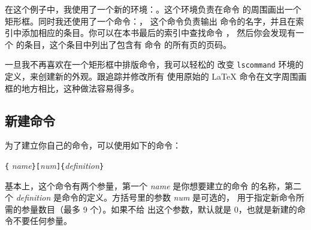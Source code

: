 \begin{example}
\begin{lscommand}
\end{lscommand}
\end{example}

在这个例子中，我使用了一个新的环境：。这个环境负责在命令
的周围画出一个矩形框。同时我还使用了一个命令：， 这个命令负责输出
命令的名字，并且在索引中添加相应的条目。你可以在本书最后的索引中查找命令 ，
然后你会发现有一个  的条目，这个条目中列出了包含有  命令
的所有页的页码。

一旦我不再喜欢在一个矩形框中排版命令，我可以轻松的
改变 \texttt{lscommand} 环境的定义，来创建新的外观。跟追踪并修改所有
使用原始的 \LaTeX{} 命令在文字周围画框的地方相比，这种做法容易得多。

\subsection{新建命令}

为了建立你自己的命令，可以使用如下的命令：
\begin{lscommand}
\verb|{|%
       \emph{name}\verb|}[|\emph{num}\verb|]{|\emph{definition}\verb|}|
\end{lscommand}
基本上，这个命令有两个参量，第一个 \emph{name} 是你想要建立的命令
的名称，第二个 \emph{definition} 是命令的定义。方括号里的参数 \emph{num} 是可选的，
用于指定新命令所需的参量数目（最多 9 个）。如果不给
出这个参数，默认就是 0，也就是新建的命令不要任何参量。

